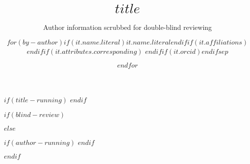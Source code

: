\title{$title$}

$if(title-running)$
$endif$

$if(blind-review)$
\author{Author information scrubbed for double-blind reviewing}
$else$
\author{$for(by-author)$$if(it.name.literal)$$it.name.literal$$endif$$if(it.affiliations)$$endif$$if(it.attributes.corresponding)$ \corr$endif$$if(it.orcid)$$endif$$sep$ \and $endfor$}

$if(author-running)$
$endif$


$endif$